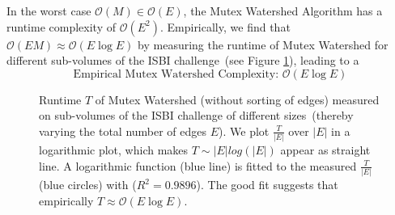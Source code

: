 \noindent In the worst case $\mathcal{O}(M) \in \mathcal{O}(E)$, the Mutex Watershed Algorithm has a runtime complexity of  $\mathcal{O}(E^2)$. Empirically, we find that $\mathcal{O}(EM) \approx \mathcal{O}(E\log E)$ by measuring the runtime of Mutex Watershed for different sub-volumes of the ISBI challenge~(see Figure \ref{fig:scalingM}), leading to a 
\begin{equation}
    \text{Empirical Mutex Watershed Complexity: }\mathcal{O}(E \log E)
\end{equation}


\begin{figure}
   \centering
   \caption{Runtime $T$ of Mutex Watershed (without sorting of edges) measured on sub-volumes of the ISBI challenge of different sizes~(thereby varying the total number of edges $E$). We plot $\frac{T}{|E|}$ over $|E|$ in a logarithmic plot, which makes $T \sim |E| log(|E|)$ appear as straight line. A logarithmic function (blue line) is fitted to the measured $\frac{T}{|E|}$ (blue circles) with ($R^2 = 0.9896$). The good fit suggests that empirically $T \approx \mathcal{O}(E \log E)$.}
\label{fig:scalingM}
\end{figure}


